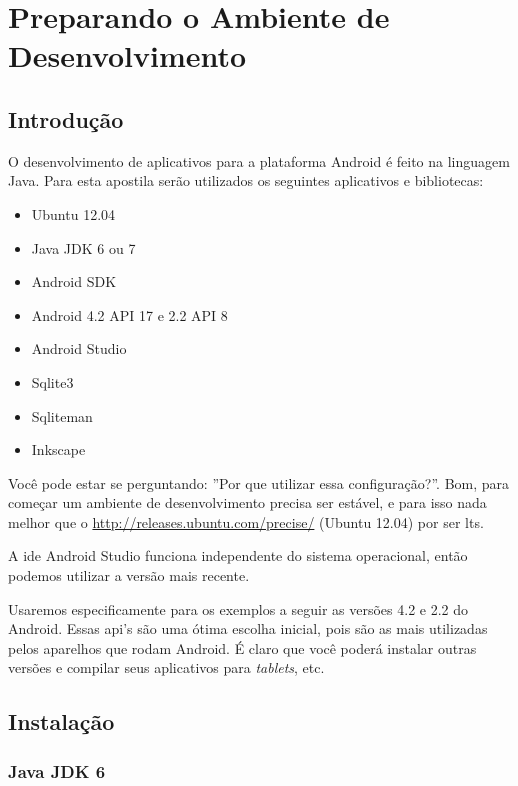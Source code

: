 \chapter{Preparando o Ambiente de Desenvolvimento}

\section{Introdução}

O desenvolvimento de aplicativos para a plataforma Android é feito na linguagem Java.
Para esta apostila serão utilizados os seguintes aplicativos e bibliotecas:

\begin{itemize}
	\item Ubuntu 12.04
	\item Java JDK 6 ou 7
	\item Android SDK
	\item Android 4.2 API 17 e 2.2 API 8
	\item Android Studio
	\item Sqlite3
	\item Sqliteman
	\item Inkscape
\end{itemize}

Você pode estar se perguntando: ''Por que utilizar essa configuração?''. Bom, para começar
um ambiente de desenvolvimento precisa ser estável, e para isso nada melhor que o
 \url{http://releases.ubuntu.com/precise/} (Ubuntu 12.04) por ser \gls{lts}.

A \gls{ide} Android Studio funciona independente do sistema operacional, então podemos utilizar a versão
mais recente.

Usaremos especificamente para os exemplos a seguir as versões 4.2 e 2.2 do Android.
Essas \gls{api}'s são uma
ótima escolha inicial, pois são as mais utilizadas pelos aparelhos que rodam Android.
É claro que você poderá instalar outras versões e compilar seus aplicativos para \textit{tablets}, etc.

\section{Instalação}

\subsection{Java JDK 6}

